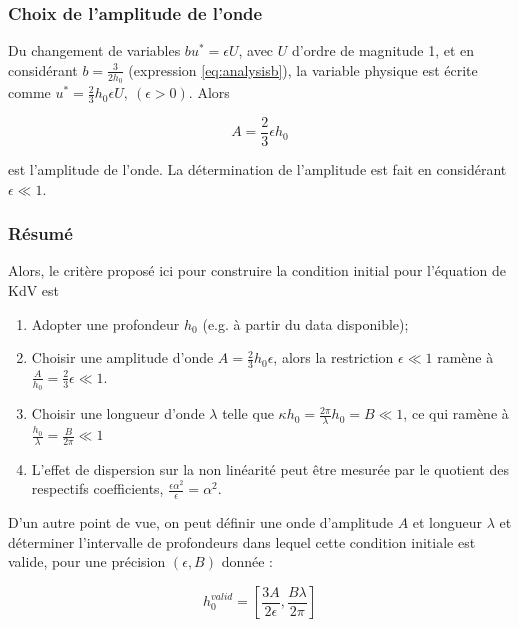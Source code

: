 \subsubsection{Choix de l'amplitude de l'onde}

\indent Du changement de variables $bu^* = \epsilon U$, avec $U$ d'ordre de magnitude 1, et en considérant $b = \frac{3}{2h_0}$ (expression \ref{eq:analysisb}), la variable physique est écrite comme $u^* = \frac{2}{3}h_0\epsilon U, \ (\epsilon > 0)$. Alors

\begin{equation*}
A = \frac{2}{3}\epsilon h_0
\end{equation*}

\noindent est l'amplitude de l'onde. La détermination de l'amplitude est fait en considérant $\epsilon \ll 1$. 

\subsubsection{Résumé}

\indent Alors, le critère proposé ici pour construire la condition initial pour l'équation de KdV est 

\begin{enumerate}
\item Adopter une profondeur $h_0$ (e.g. à partir du data disponible);
\item Choisir une amplitude d'onde $A = \frac{2}{3}h_0\epsilon$, alors la restriction $\epsilon \ll 1$ ramène à $\frac{A}{h_0} = \frac{2}{3}\epsilon \ll 1$.
\item Choisir une longueur d'onde $\lambda$ telle que $\kappa h_0 = \frac{2\pi}{\lambda}h_0 = B \ll 1$, ce qui ramène à $\frac{h_0}{\lambda} = \frac{B}{2\pi} \ll 1$
\item L'effet de dispersion sur la non linéarité peut être mesurée par le quotient des respectifs coefficients, $\frac{\epsilon \alpha^2}{\epsilon} = \alpha^2$.
\end{enumerate}

\indent D'un autre point de vue, on peut définir une onde d'amplitude  $A$ et longueur $\lambda$ et déterminer l'intervalle de profondeurs dans lequel cette condition initiale est valide, pour une précision $(\epsilon,B)$ donnée :

\begin{equation} 
\label{eq:hvalid}
h_0^{valid} = \left[ \frac{3A}{2\epsilon}, \frac{B\lambda}{2\pi}\right]
\end{equation}

